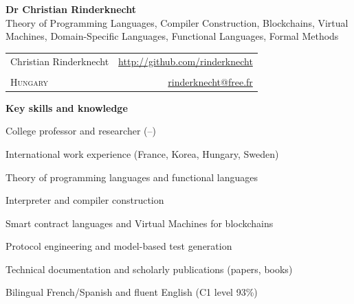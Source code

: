 \documentclass[a4paper,11pt]{article}
\begin{document}
\begin{center}
\textbf{\LARGE Dr Christian Rinderknecht}\\[5mm]
       {\large Theory of Programming Languages, Compiler Construction,
         Blockchains, Virtual Machines, Domain\hyp{}Specific
         Languages, Functional Languages, Formal Methods}
\end{center}

\noindent
\begin{tabular}{@{}l@{\qquad\qquad\qquad\qquad}r@{}}
  Christian Rinderknecht
& \url{http://github.com/rinderknecht}\\
  \phantom{\ }
& \texttt{\phantom{+XX XX XXX XXXX}}\\
  \textsc{Hungary}
& \url{rinderknecht@free.fr}
\end{tabular}

\medskip


\pagestyle{empty}

\bigskip
\noindent\textbf{\large Key skills and knowledge}
\begin{itemize*}

  \item College professor and researcher
    (--)

  \item International work experience (France, Korea, Hungary, Sweden)

  \item Theory of programming languages and functional languages

  \item Interpreter and compiler construction

  \item Smart contract languages and Virtual Machines for blockchains


  \item Protocol engineering and model-based test generation

  \item Technical documentation and scholarly publications (papers, books)

  \item Bilingual French/Spanish and fluent English (C1 level 93\%)

\end{itemize*}
\end{document}
